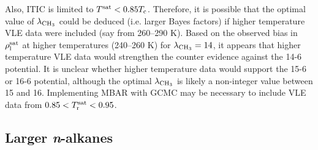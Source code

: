 \documentclass[preprint,letterpaper,floatfix,citeautoscript,aip,jcp]{revtex4-1}
\begin{document}
Also, ITIC is limited to $T^{\rm sat} < 0.85 T_{\rm c}$. Therefore, it is possible that the optimal value of $\lambda_{\rm CH_3}$ could be deduced (i.e. larger Bayes factors) if higher temperature VLE data were included (say from 260--290 K). Based on the observed bias in $\rho_{\rm l}^{\rm sat}$ at higher temperatures (240--260 K) for $\lambda_{\rm CH_3} = 14$, it appears that higher temperature VLE data would strengthen the counter evidence against the 14-6 potential. It is unclear whether higher temperature data would support the 15-6 or 16-6 potential, although the optimal $\lambda_{\rm CH_3}$ is likely a non-integer value between 15 and 16. 
Implementing MBAR with GCMC may be necessary to include VLE data from $0.85 < T_{\rm r}^{\rm sat} < 0.95$.


\subsection{Larger \textit{n}-alkanes} \label{Larger_nalkanes}

\end{document}
